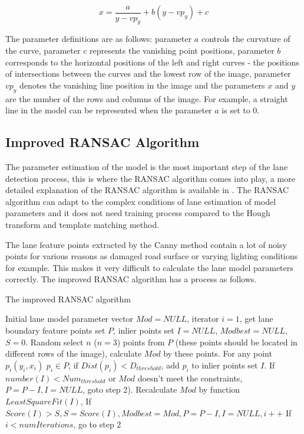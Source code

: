 \begin{equation}
x = \frac{a}{y-vp_y}+b(y-vp_y) +c
\label{eq1}
\end{equation}

The parameter definitions are as follows: parameter $a$ controls the curvature of the curve, parameter $c$ represents the vanishing point positions, parameter $b$ corresponds to the horizontal positions of the left and right curves - the positions of intersections between the curves and the lowest row of the image, parameter $vp_y$ denotes the vanishing line position in the image and the parameters $x$ and $y$ are the number of the rows and columns of the image. For example, a straight line in the model can be represented when the parameter $a$ is set to 0. 


\subsection{Improved RANSAC Algorithm}

The parameter estimation of the model is the most important step of the lane detection process, this is where the RANSAC algorithm comes into play, a more detailed explanation of the RANSAC algorithm is available in \cite{ransac2}. The RANSAC algorithm can adapt to the
complex conditions of lane estimation of model parameters
and it does not need training process compared to the Hough
transform and template matching method.

The lane feature points extracted by the Canny method contain a lot of noisy points for various reasons as damaged road surface or varying lighting conditions for example. This makes it very difficult to calculate the lane model parameters correctly. The improved RANSAC algorithm has a process as follows.

\begin{algorithm}
\caption{The improved RANSAC algorithm}
\label{alg1}
\begin{algorithmic}[1]
\State Initial lane model parameter vector $Mod=NULL$, iterator $i=1$, get lane boundary feature points set $P$, inlier points set $I=NULL$, $Modbest=NULL$, $S=0$. \linebreak
\State Random select $n$ ($n=3$) points from $P$ (these points should be located in different rows of the image), calculate $Mod$ by these points.
\State For any point $p_i(y_i,x_i)$ $p_i \in P $, if $Dist(p_i)<D_{threshold}$, add $p_i$ to inlier points set $I$.
\State If $number(I) < Num_{threshold}$ or $Mod$ doesn't meet the constraints, $P=P-I,I=NULL$, goto step 2).
\State Recalculate $Mod$ by function $LeastSquareFit(I)$, If $Score(I)>S, S=Score(I), Modbest=Mod, P=P-I, I=NULL, i++$
\State If $i < numIterations$, go to step 2
\end{algorithmic}

\end{algorithm} 

